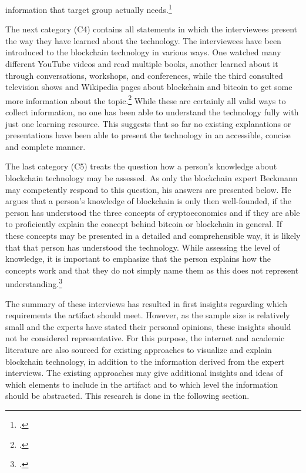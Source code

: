 information that target group actually needs.\footcites[Cf.][P80, P81, P87]{BjoernPaulewicz_Interview}[cf.][P120]{RalphBeckmann_Interview}

The next category (C4) contains all statements in which the interviewees present the way they have learned about the technology. The interviewees have been introduced to the blockchain technology in various ways. One watched many different YouTube videos and read multiple books, another learned about it through conversations, workshops, and conferences, while the third consulted television shows and Wikipedia pages about blockchain and bitcoin to get some more information about the topic.\footcites[Cf.][P6]{BjoernPaulewicz_Interview}[cf.][P72, P90]{BjoernPaulewicz_Interview}[cf.][P93, P94, P101]{RalphBeckmann_Interview} While these are certainly all valid ways to collect information, no one has been able to understand the technology fully with just one learning resource. This suggests that so far no existing explanations or presentations have been able to present the technology in an accessible, concise and complete manner.

The last category (C5) treats the question how a person's knowledge about blockchain technology may be assessed. As only the blockchain expert Beckmann may competently respond to this question, his answers are presented below. He argues that a person's knowledge of blockchain is only then well-founded, if the person has understood the three concepts of cryptoeconomics and if they are able to proficiently explain the concept behind bitcoin or blockchain in general. If these concepts may be presented in a detailed and comprehensible way, it is likely that that person has understood the technology. While assessing the level of knowledge, it is important to emphasize that the person explains how the concepts work and that they do not simply name them as this does not represent understanding.\footcites[Cf.][P100, P102, P108, P111, P118, P129, P130]{RalphBeckmann_Interview}

The summary of these interviews has resulted in first insights regarding which requirements the artifact should meet. However, as the sample size is relatively small and the experts have stated their personal opinions, these insights should not be considered representative. For this purpose, the internet and academic literature are also sourced for existing approaches to visualize and explain blockchain technology, in addition to the information derived from the expert interviews. The existing approaches may give additional insights and ideas of which elements to include in the artifact and to which level the information should be abstracted. This research is done in the following section.

